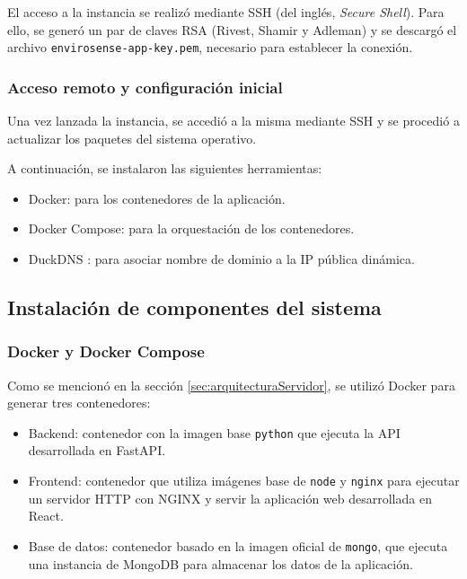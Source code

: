 El acceso a la instancia se realizó mediante SSH (del inglés, \textit{Secure
    Shell}). Para ello, se generó un par de claves RSA (Rivest, Shamir y Adleman) y
se descargó el archivo \texttt{envirosense-app-key.pem}, necesario para
establecer la conexión.

\subsubsection{Acceso remoto y configuración inicial}

Una vez lanzada la instancia, se accedió a la misma mediante SSH y se procedió
a actualizar los paquetes del sistema operativo.

A continuación, se instalaron las siguientes herramientas:
\begin{itemize}
    \item Docker: para los contenedores de la aplicación.
    \item Docker Compose: para la orquestación de los contenedores.
    \item DuckDNS \cite{DuckDNS}: para asociar nombre de dominio a la IP pública
          dinámica.
\end{itemize}

\subsection{Instalación de componentes del sistema}

\subsubsection{Docker y Docker Compose}

Como se mencionó en la sección \ref{sec:arquitecturaServidor}, se utilizó
Docker para generar tres contenedores:

\begin{itemize}
    \item Backend: contenedor con la imagen base \texttt{python} que ejecuta la API
          desarrollada en FastAPI.
    \item Frontend: contenedor que utiliza imágenes base de \texttt{node} y
          \texttt{nginx} para ejecutar un servidor HTTP con NGINX \cite{NGINX} y servir
          la aplicación web desarrollada en React.
    \item Base de datos: contenedor basado en la imagen oficial de \texttt{mongo}, que
          ejecuta una instancia de MongoDB para almacenar los datos de la aplicación.
\end{itemize}

